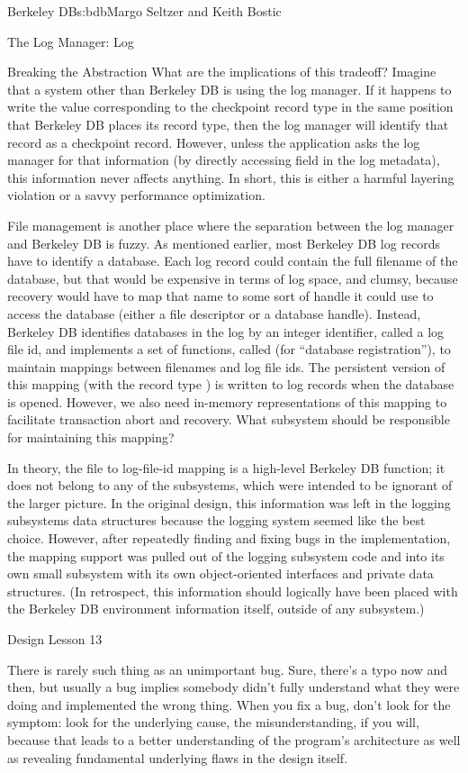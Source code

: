 \begin{aosachapter}{Berkeley DB}{s:bdb}{Margo Seltzer and Keith Bostic}
\begin{aosasect1}{The Log Manager: Log}
\begin{aosasect2}{Breaking the Abstraction}
What are the implications of this tradeoff? Imagine that a system
other than Berkeley DB is using the log manager. If it happens to
write the value corresponding to the checkpoint record type in the
same position that Berkeley DB places its record type, then the log
manager will identify that record as a checkpoint record. However,
unless the application asks the log manager for that information (by
directly accessing  field in the log metadata),
this information never affects anything. In short, this is either a
harmful layering violation or a savvy performance optimization.

File management is another place where the separation between the log
manager and Berkeley DB is fuzzy. As mentioned earlier, most Berkeley
DB log records have to identify a database. Each log record could
contain the full filename of the database, but that would be
expensive in terms of log space, and clumsy, because recovery would
have to map that name to some sort of handle it could use to access
the database (either a file descriptor or a database handle). Instead,
Berkeley DB identifies databases in the log by an integer identifier,
called a log file id, and implements a set of functions, called
 (for ``database registration''), to maintain mappings
between filenames and log file ids. The persistent version of this
mapping (with the record type )
is written to log records when the database is opened.  However, we also need
in-memory representations of this mapping to facilitate transaction
abort and recovery. What subsystem should be responsible for
maintaining this mapping?

In theory, the file to log-file-id mapping is a high-level Berkeley DB
function; it does not belong to any of the subsystems, which were
intended to be ignorant of the larger picture. In the original design,
this information was left in the logging subsystems data structures
because the logging system seemed like the best choice. However, after
repeatedly finding and fixing bugs in the implementation, the mapping
support was pulled out of the logging subsystem code and into its own
small subsystem with its own object-oriented interfaces and private
data structures.  (In retrospect, this information should logically
have been placed with the Berkeley DB environment information itself,
outside of any subsystem.) 

\begin{aosabox}{Design Lesson 13}

There is rarely such thing as an unimportant bug. Sure, there's a typo
now and then, but usually a bug implies somebody didn't fully
understand what they were doing and implemented the wrong thing.
When you fix a bug, don't look for the symptom: look for the
underlying cause, the misunderstanding, if you will, because that
leads to a better understanding of the program's architecture as well
as revealing fundamental underlying flaws in the design itself.


\end{aosabox}
\end{aosasect2}
\end{aosasect1}
\end{aosachapter}
